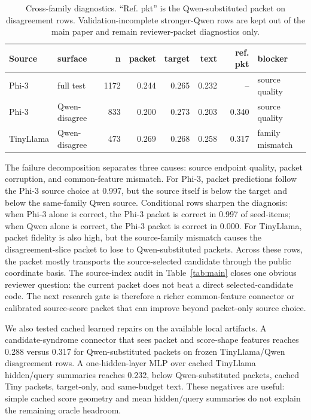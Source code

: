 \documentclass{article}
\begin{document}
\begin{table}[t]
  \centering
  \small
  \setlength{\tabcolsep}{3.4pt}
  \begin{tabular}{llrrrrrl}
    \toprule
    Source & surface & n & packet & target & text & ref. pkt & blocker \\
    \midrule
    Phi-3 & full test & 1172 & 0.244 & 0.265 & 0.232 & -- & source quality \\
    Phi-3 & Qwen-disagree & 833 & 0.200 & 0.273 & 0.203 & 0.340 & source quality \\
    TinyLlama & Qwen-disagree & 473 & 0.269 & 0.268 & 0.258 & 0.317 & family mismatch \\
    \bottomrule
  \end{tabular}
  \caption{Cross-family diagnostics. ``Ref. pkt'' is the Qwen-substituted packet on disagreement rows. Validation-incomplete stronger-Qwen rows are kept out of the main paper and remain reviewer-packet diagnostics only.}
  \label{tab:falsification}
\end{table}

The failure decomposition separates three causes: source endpoint quality, packet corruption, and common-feature mismatch. For Phi-3, packet predictions follow the Phi-3 source choice at 0.997, but the source itself is below the target and below the same-family Qwen source. Conditional rows sharpen the diagnosis: when Phi-3 alone is correct, the Phi-3 packet is correct in 0.997 of seed-items; when Qwen alone is correct, the Phi-3 packet is correct in 0.000. For TinyLlama, packet fidelity is also high, but the source-family mismatch causes the disagreement-slice packet to lose to Qwen-substituted packets. Across these rows, the packet mostly transports the source-selected candidate through the public coordinate basis. The source-index audit in Table~\ref{tab:main} closes one obvious reviewer question: the current packet does not beat a direct selected-candidate code. The next research gate is therefore a richer common-feature connector or calibrated source-score packet that can improve beyond packet-only source choice.

We also tested cached learned repairs on the available local artifacts. A candidate-syndrome connector that sees packet and score-shape features reaches 0.288 versus 0.317 for Qwen-substituted packets on frozen TinyLlama/Qwen disagreement rows. A one-hidden-layer MLP over cached TinyLlama hidden/query summaries reaches 0.232, below Qwen-substituted packets, cached Tiny packets, target-only, and same-budget text. These negatives are useful: simple cached score geometry and mean hidden/query summaries do not explain the remaining oracle headroom.
\end{document}

